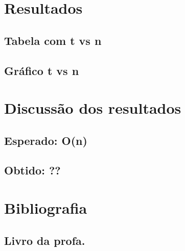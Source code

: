 \documentclass[bigger]{beamer}
\begin{document}
\section{Resultados}
\label{sec-6}
\subsection{Tabela com t vs n}
\label{sec-6-1}
\subsection{Gráfico t vs n}
\label{sec-6-2}
\section{Discussão dos resultados}
\label{sec-7}
\subsection{Esperado: O(n)}
\label{sec-7-1}
\subsection{Obtido: ??}
\label{sec-7-2}
\section{Bibliografia}
\label{sec-8}
\subsection{Livro da profa.}
\label{sec-8-1}
\end{document}
